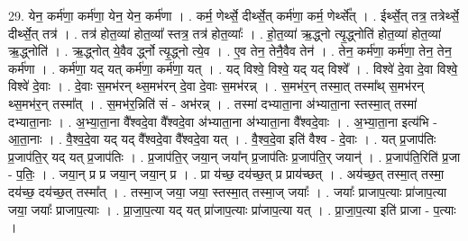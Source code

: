 \documentclass[17pt]{extarticle}
\begin{document}
29. येन॒ कर्म॑णा॒ कर्म॑णा॒ येन॒ येन॒ कर्म॑णा । . कर्म॒ णेर्थ्से॒ दीर्थ्से॒त् कर्म॑णा॒ कर्म॒ णेर्थ्से᳚त् । . ईर्थ्से॒त् तत्र॒ तत्रेर्थ्से॒ दीर्थ्से॒त् तत्र॑ । . तत्र॑ होत॒व्या॑ होत॒व्या᳚ स्तत्र॒ तत्र॑ होत॒व्याः᳚ । . हो॒त॒व्या॑ ऋ॒द्ध्नो त्यृ॒द्ध्नोति॑ होत॒व्या॑ होत॒व्या॑ ऋ॒द्ध्नोति॑ । . ऋ॒द्ध्नोत् ये॒वैव र्द्ध्नो त्यृ॒द्ध्नो त्ये॒व । . ए॒व तेन॒ तेनै॒वैव तेन॑ । . तेन॒ कर्म॑णा॒ कर्म॑णा॒ तेन॒ तेन॒ कर्म॑णा । . कर्म॑णा॒ यद् यत् कर्म॑णा॒ कर्म॑णा॒ यत् । . यद् विश्वे॒ विश्वे॒ यद् यद् विश्वे᳚ । . विश्वे॑ दे॒वा दे॒वा विश्वे॒ विश्वे॑ दे॒वाः । . दे॒वाः स॒मभ॑रन् थ्स॒मभ॑रन् दे॒वा दे॒वाः स॒मभ॑रन्न् । . स॒मभ॑र॒न् तस्मा॒त् तस्मा᳚थ् स॒मभ॑रन् थ्स॒मभ॑र॒न् तस्मा᳚त् । . स॒मभ॑र॒न्निति॑ सं - अभ॑रन्न् । . तस्मा॑ दभ्याता॒ना अ॑भ्याता॒ना स्तस्मा॒त् तस्मा॑ दभ्याता॒नाः । . अ॒भ्या॒ता॒ना वै᳚श्वदे॒वा वै᳚श्वदे॒वा अ॑भ्याता॒ना अ॑भ्याता॒ना वै᳚श्वदे॒वाः । . अ॒भ्या॒ता॒ना इत्य॑भि - आ॒ता॒नाः । . वै॒श्व॒दे॒वा यद् यद् वै᳚श्वदे॒वा वै᳚श्वदे॒वा यत् । . वै॒श्व॒दे॒वा इति॑ वैश्व - दे॒वाः । . यत् प्र॒जाप॑तिः प्र॒जाप॑ति॒र् यद् यत् प्र॒जाप॑तिः । . प्र॒जाप॑ति॒र् जया॒न् जया᳚न् प्र॒जाप॑तिः प्र॒जाप॑ति॒र् जयान्॑ । . प्र॒जाप॑ति॒रिति॑ प्र॒जा - प॒तिः॒ । . जया॒न् प्र प्र जया॒न् जया॒न् प्र । . प्रा य॑च्छ॒ दय॑च्छ॒त् प्र प्राय॑च्छत् । . अय॑च्छ॒त् तस्मा॒त् तस्मा॒ दय॑च्छ॒ दय॑च्छ॒त् तस्मा᳚त् । . तस्मा॒ज् जया॒ जया॒ स्तस्मा॒त् तस्मा॒ज् जयाः᳚ । . जयाः᳚ प्राजाप॒त्याः प्रा॑जाप॒त्या जया॒ जयाः᳚ प्राजाप॒त्याः । . प्रा॒जा॒प॒त्या यद् यत् प्रा॑जाप॒त्याः प्रा॑जाप॒त्या यत् । . प्रा॒जा॒प॒त्या इति॑ प्राजा - प॒त्याः । \newline
\end{document}
